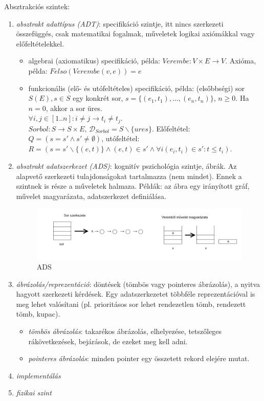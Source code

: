 \documentclass[margin=0px]{article}
\begin{document}
	Absztrakciós szintek:
	\begin{enumerate}
		\item \textit{absztrakt adattípus (ADT)}: specifikáció szintje, itt nincs szerkezeti összefüggés, csak matematikai fogalmak, műveletek logikai axiómákkal vagy előfeltételekkel.
		\begin{itemize}
			\item algebrai (axiomatikus) specifikáció, példa: $Verembe : V \times E \to V$. Axióma, példa: $Felso(Verembe(v,e)) = e$
			\item funkcionális (elő- és utófeltételes) specifikáció, példa: (elsőbbségi) sor $S(E), s \in S$ egy konkrét sor, $s = \{(e_1, t_1), ..., (e_n, t_n)\}$, $n \geq 0$. Ha $n=0$, akkor a sor üres. \\
			$\forall i,j \in [1..n]: i \neq j \to t_i \neq t_j$. \\
			$Sorbol: S \to S \times E$, $\mathcal{D}_{Sorbol} = S \backslash \{ures\}$. Előfeltétel: $Q = (s = s' \wedge s' \neq \emptyset)$, utófeltétel: $R = (s = s' \backslash \{(e,t)\} \wedge (e,t) \in s' \wedge \forall i (e_i, t_i) \in s' : t \leq t_i)$.
		\end{itemize}
		\item \textit{absztrakt adatszerkezet (ADS)}: kognitív pszichológia szintje, ábrák. Az alapvető szerkezeti tulajdonságokat tartalmazza (nem mindet). Ennek a szintnek is része a műveletek halmaza. Példák: az ábra egy irányított gráf, művelet magyarázata, adatszerkezet definiálása.
		\begin{figure}[H]
			\centering
			\includegraphics[width=1\textwidth]{img/ads.png}
			\caption{ADS}
		\end{figure}
		\item \textit{ábrázolás/reprezentáció}: döntések (tömbös vagy pointeres ábrázolás), a nyitva hagyott szerkezeti kérdések. Egy adatszerkezetet többféle reprezentációval is meg lehet valósítani (pl. prioritásos sor lehet rendezetlen tömb, rendezett tömb, kupac).
		\begin{itemize}
			\item \textit{tömbös ábrázolás}: takarékos ábrázolás, elhelyezése, tetszőleges rákövetkezések, bejárások, de ezeket meg kell adni.
			\item \textit{pointeres ábrázolás}: minden pointer egy összetett rekord elejére mutat.
		\end{itemize}
		\item \textit{implementálás}
		\item \textit{fizikai szint}
	\end{enumerate}
	
\end{document}
